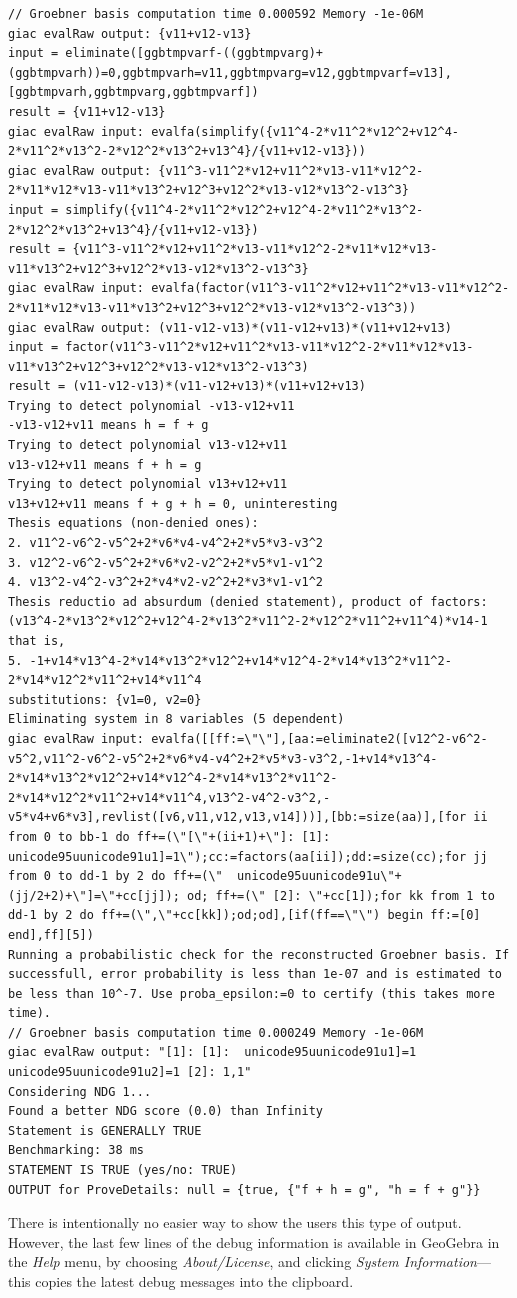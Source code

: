 \documentclass{article}
\begin{document}
{\begin{lstlisting}[language=mylog]
// Groebner basis computation time 0.000592 Memory -1e-06M
giac evalRaw output: {v11+v12-v13}
input = eliminate([ggbtmpvarf-((ggbtmpvarg)+(ggbtmpvarh))=0,ggbtmpvarh=v11,ggbtmpvarg=v12,ggbtmpvarf=v13],[ggbtmpvarh,ggbtmpvarg,ggbtmpvarf])
result = {v11+v12-v13}
giac evalRaw input: evalfa(simplify({v11^4-2*v11^2*v12^2+v12^4-2*v11^2*v13^2-2*v12^2*v13^2+v13^4}/{v11+v12-v13}))
giac evalRaw output: {v11^3-v11^2*v12+v11^2*v13-v11*v12^2-2*v11*v12*v13-v11*v13^2+v12^3+v12^2*v13-v12*v13^2-v13^3}
input = simplify({v11^4-2*v11^2*v12^2+v12^4-2*v11^2*v13^2-2*v12^2*v13^2+v13^4}/{v11+v12-v13})
result = {v11^3-v11^2*v12+v11^2*v13-v11*v12^2-2*v11*v12*v13-v11*v13^2+v12^3+v12^2*v13-v12*v13^2-v13^3}
giac evalRaw input: evalfa(factor(v11^3-v11^2*v12+v11^2*v13-v11*v12^2-2*v11*v12*v13-v11*v13^2+v12^3+v12^2*v13-v12*v13^2-v13^3))
giac evalRaw output: (v11-v12-v13)*(v11-v12+v13)*(v11+v12+v13)
input = factor(v11^3-v11^2*v12+v11^2*v13-v11*v12^2-2*v11*v12*v13-v11*v13^2+v12^3+v12^2*v13-v12*v13^2-v13^3)
result = (v11-v12-v13)*(v11-v12+v13)*(v11+v12+v13)
Trying to detect polynomial -v13-v12+v11
-v13-v12+v11 means h = f + g
Trying to detect polynomial v13-v12+v11
v13-v12+v11 means f + h = g
Trying to detect polynomial v13+v12+v11
v13+v12+v11 means f + g + h = 0, uninteresting
Thesis equations (non-denied ones):
2. v11^2-v6^2-v5^2+2*v6*v4-v4^2+2*v5*v3-v3^2
3. v12^2-v6^2-v5^2+2*v6*v2-v2^2+2*v5*v1-v1^2
4. v13^2-v4^2-v3^2+2*v4*v2-v2^2+2*v3*v1-v1^2
Thesis reductio ad absurdum (denied statement), product of factors:
(v13^4-2*v13^2*v12^2+v12^4-2*v13^2*v11^2-2*v12^2*v11^2+v11^4)*v14-1
that is,
5. -1+v14*v13^4-2*v14*v13^2*v12^2+v14*v12^4-2*v14*v13^2*v11^2-2*v14*v12^2*v11^2+v14*v11^4
substitutions: {v1=0, v2=0}
Eliminating system in 8 variables (5 dependent)
giac evalRaw input: evalfa([[ff:=\"\"],[aa:=eliminate2([v12^2-v6^2-v5^2,v11^2-v6^2-v5^2+2*v6*v4-v4^2+2*v5*v3-v3^2,-1+v14*v13^4-2*v14*v13^2*v12^2+v14*v12^4-2*v14*v13^2*v11^2-2*v14*v12^2*v11^2+v14*v11^4,v13^2-v4^2-v3^2,-v5*v4+v6*v3],revlist([v6,v11,v12,v13,v14]))],[bb:=size(aa)],[for ii from 0 to bb-1 do ff+=(\"[\"+(ii+1)+\"]: [1]:  unicode95uunicode91u1]=1\");cc:=factors(aa[ii]);dd:=size(cc);for jj from 0 to dd-1 by 2 do ff+=(\"  unicode95uunicode91u\"+(jj/2+2)+\"]=\"+cc[jj]); od; ff+=(\" [2]: \"+cc[1]);for kk from 1 to dd-1 by 2 do ff+=(\",\"+cc[kk]);od;od],[if(ff==\"\") begin ff:=[0] end],ff][5])
Running a probabilistic check for the reconstructed Groebner basis. If successfull, error probability is less than 1e-07 and is estimated to be less than 10^-7. Use proba_epsilon:=0 to certify (this takes more time).
// Groebner basis computation time 0.000249 Memory -1e-06M
giac evalRaw output: "[1]: [1]:  unicode95uunicode91u1]=1  unicode95uunicode91u2]=1 [2]: 1,1"
Considering NDG 1...
Found a better NDG score (0.0) than Infinity
Statement is GENERALLY TRUE
Benchmarking: 38 ms
STATEMENT IS TRUE (yes/no: TRUE)
OUTPUT for ProveDetails: null = {true, {"f + h = g", "h = f + g"}}
\end{lstlisting}
} %
There is intentionally no easier way to show the users this type of output. However, the last few lines of the debug information is available in GeoGebra in the \textit{Help} menu, by choosing \textit{About/License}, and clicking \textit{System Information}---this copies the latest debug messages into the clipboard.
\end{document}
